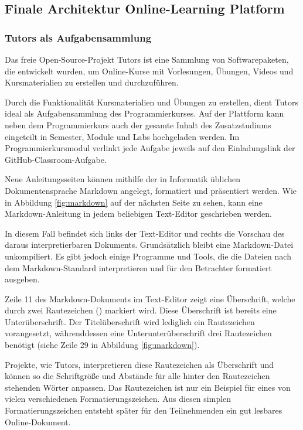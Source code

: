 \subsection{Finale Architektur Online-Learning Platform}
\subsubsection{Tutors als Aufgabensammlung}\label{finale-architektur-tutors}
Das freie Open-Source-Projekt Tutors ist eine Sammlung von Softwarepaketen,
die entwickelt wurden, um Online-Kurse mit Vorlesungen, Übungen, Videos und
Kursmaterialien zu erstellen und durchzuführen. \parencite{tutors}

Durch die Funktionalität Kursmaterialien und Übungen zu erstellen, dient Tutors
ideal als Aufgabensammlung des Programmierkurses. Auf der Plattform kann neben
dem Programmierkurs auch der gesamte Inhalt des Zusatzstudiums eingeteilt in
Semester, Module und Labs hochgeladen werden. Im Programmierkursmodul verlinkt
jede Aufgabe jeweils auf den Einladungslink der GitHub-Classroom-Aufgabe.

Neue Anleitungsseiten können mithilfe der in Informatik üblichen
Dokumentensprache Markdown angelegt, formatiert und präsentiert werden. Wie in
Abbildung \ref{fig:markdown} auf der nächsten Seite zu sehen, kann eine 
Markdown-Anleitung in jedem beliebigen Text-Editor geschrieben werden.

In diesem Fall befindet sich links der Text-Editor und rechts die Vorschau des
daraus interpretierbaren Dokuments. Grundsätzlich bleibt eine Markdown-Datei
unkompiliert. Es gibt jedoch einige Programme und Tools, die die Dateien
nach dem Markdown-Standard interpretieren und für den Betrachter formatiert
ausgeben.

Zeile 11 des Markdown-Dokuments im Text-Editor zeigt eine Überschrift, welche
durch zwei Rautezeichen (\code{\#\#}) markiert wird. Diese Überschrift ist
bereits eine Unterüberschrift. Der Titelüberschrift wird lediglich ein
Rautezeichen vorangesetzt, währenddessen eine Unterunterüberschrift drei
Rautezeichen benötigt (siehe Zeile 29 in Abbildung \ref{fig:markdown}).

Projekte, wie Tutors, interpretieren diese Rautezeichen als Überschrift und
können so die Schriftgröße und Abstände für alle hinter den Rautezeichen
stehenden Wörter anpassen. Das Rautezeichen ist nur ein Beispiel für eines von
vielen verschiedenen Formatierungszeichen. Aus diesen simplen
Formatierungszeichen entsteht später für den Teilnehmenden ein gut lesbares
Online-Dokument. \parencite{markdown}

